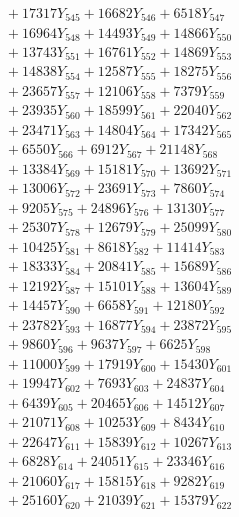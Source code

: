 \documentclass[a4paper,10pt]{article}
\begin{document}
{\begin{align}
&\;  + 17317 Y_{545} + 16682 Y_{546} + 6518 Y_{547} \\[0.3ex]
&\;  + 16964 Y_{548} + 14493 Y_{549} + 14866 Y_{550} \\[0.3ex]
&\;  + 13743 Y_{551} + 16761 Y_{552} + 14869 Y_{553} \\[0.3ex]
&\;  + 14838 Y_{554} + 12587 Y_{555} + 18275 Y_{556} \\[0.3ex]
&\;  + 23657 Y_{557} + 12106 Y_{558} + 7379 Y_{559} \\[0.3ex]
&\;  + 23935 Y_{560} + 18599 Y_{561} + 22040 Y_{562} \\[0.3ex]
&\;  + 23471 Y_{563} + 14804 Y_{564} + 17342 Y_{565} \\[0.3ex]
&\;  + 6550 Y_{566} + 6912 Y_{567} + 21148 Y_{568} \\[0.5ex]\allowbreak
&\;  + 13384 Y_{569} + 15181 Y_{570} + 13692 Y_{571} \\[0.3ex]
&\;  + 13006 Y_{572} + 23691 Y_{573} + 7860 Y_{574} \\[0.3ex]
&\;  + 9205 Y_{575} + 24896 Y_{576} + 13130 Y_{577} \\[0.3ex]
&\;  + 25307 Y_{578} + 12679 Y_{579} + 25099 Y_{580} \\[0.3ex]
&\;  + 10425 Y_{581} + 8618 Y_{582} + 11414 Y_{583} \\[0.3ex]
&\;  + 18333 Y_{584} + 20841 Y_{585} + 15689 Y_{586} \\[0.3ex]
&\;  + 12192 Y_{587} + 15101 Y_{588} + 13604 Y_{589} \\[0.3ex]
&\;  + 14457 Y_{590} + 6658 Y_{591} + 12180 Y_{592} \\[0.3ex]
&\;  + 23782 Y_{593} + 16877 Y_{594} + 23872 Y_{595} \\[0.3ex]
&\;  + 9860 Y_{596} + 9637 Y_{597} + 6625 Y_{598} \\[0.5ex]\allowbreak
&\;  + 11000 Y_{599} + 17919 Y_{600} + 15430 Y_{601} \\[0.3ex]
&\;  + 19947 Y_{602} + 7693 Y_{603} + 24837 Y_{604} \\[0.3ex]
&\;  + 6439 Y_{605} + 20465 Y_{606} + 14512 Y_{607} \\[0.3ex]
&\;  + 21071 Y_{608} + 10253 Y_{609} + 8434 Y_{610} \\[0.3ex]
&\;  + 22647 Y_{611} + 15839 Y_{612} + 10267 Y_{613} \\[0.3ex]
&\;  + 6828 Y_{614} + 24051 Y_{615} + 23346 Y_{616} \\[0.3ex]
&\;  + 21060 Y_{617} + 15815 Y_{618} + 9282 Y_{619} \\[0.3ex]
&\;  + 25160 Y_{620} + 21039 Y_{621} + 15379 Y_{622} \\[0.3ex]

\end{align}}
\end{document}
